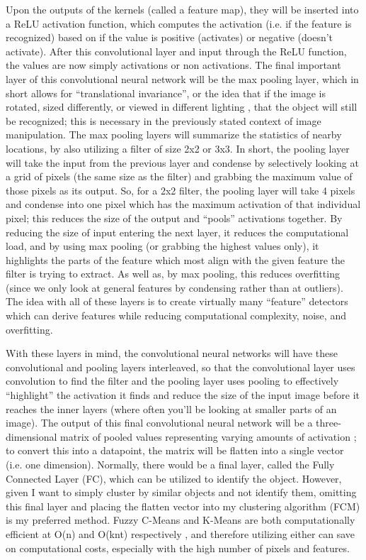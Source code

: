 \documentclass[10pt,twocolumn]{article}
\begin{document}
Upon the outputs of the kernels (called a feature map), they will be inserted into a ReLU activation function, which computes the activation (i.e. if the feature is recognized) based on if the value is positive (activates) or negative (doesn’t activate). After this convolutional layer and input through the ReLU function, the values are now simply activations or non activations. The final important layer of this convolutional neural network will be the max pooling layer, which in short allows for “translational invariance”, or the idea that if the image is rotated, sized differently, or viewed in different lighting \cite{Khandelwal2018}, that the object will still be recognized; this is necessary in the previously stated context of image manipulation. The max pooling layers will summarize the statistics of nearby locations, by also utilizing a filter of size 2x2 or 3x3. In short, the pooling layer will take the input from the previous layer and condense by selectively looking at a grid of pixels (the same size as the filter) and grabbing the maximum value of those pixels as its output. So, for a 2x2 filter, the pooling layer will take 4 pixels and condense into one pixel which has the maximum activation of that individual pixel; this reduces the size of the output and “pools” activations together. By reducing the size of input entering the next layer, it reduces the computational load, and by using max pooling (or grabbing the highest values only), it highlights the parts of the feature which most align with the given feature the filter is trying to extract. As well as, by max pooling, this reduces overfitting (since we only look at general features by condensing rather than at outliers). The idea with all of these layers is to create virtually many “feature” detectors which can derive features while reducing computational complexity, noise, and overfitting. 

With these layers in mind, the convolutional neural networks will have these convolutional and pooling layers interleaved, so that the convolutional layer uses convolution to find the filter and the pooling layer uses pooling to effectively “highlight” the activation it finds and reduce the size of the input image before it reaches the inner layers (where often you’ll be looking at smaller parts of an image). The output of this final convolutional neural network will be a three-dimensional matrix of pooled values representing varying amounts of activation \cite{Arc2018}; to convert this into a datapoint, the matrix will be flatten into a single vector (i.e. one dimension). Normally, there would be a final layer, called the Fully Connected Layer (FC), which can be utilized to identify the object. However, given I want to simply cluster by similar objects and not identify them, omitting this final layer and placing the flatten vector into my clustering algorithm (FCM) is my preferred method. Fuzzy C-Means and K-Means are both computationally efficient at O(n) and O(knt) respectively \cite{Mittal2021}, and therefore utilizing either can save on computational costs, especially with the high number of pixels and features. 
\end{document}
